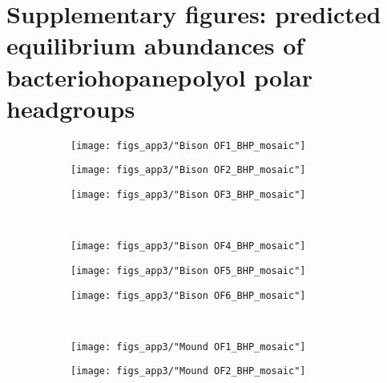 \chapter{Supplementary figures: predicted equilibrium abundances of bacteriohopanepolyol polar headgroups}

\singlespace

\begin{figure}[h]
\centering
    \begin{subfigure}[b]{\linewidth}
        \texttt{[image: figs\_app3/"Bison OF1\_BHP\_mosaic"]}
        \label{fig:BP1_degform}
    \end{subfigure}
    \begin{subfigure}[b]{\linewidth}
        \texttt{[image: figs\_app3/"Bison OF2\_BHP\_mosaic"]}
        \label{fig:BP2_degform}
    \end{subfigure}
\end{figure}

\newpage

\begin{figure}[h]\ContinuedFloat
    \begin{subfigure}[b]{\linewidth}
        \texttt{[image: figs\_app3/"Bison OF3\_BHP\_mosaic"]}
        \label{fig:BP3_degform}
    \end{subfigure}\\[-4ex]
    \begin{subfigure}[b]{\linewidth}
    	\texttt{[image: figs\_app3/"Bison OF4\_BHP\_mosaic"]}
        \label{fig:BP4_degform}
    \end{subfigure}
\end{figure}

\newpage

\begin{figure}[h]\ContinuedFloat
    \begin{subfigure}[b]{\linewidth}
        \texttt{[image: figs\_app3/"Bison OF5\_BHP\_mosaic"]}
        \label{fig:BP5_degform}
    \end{subfigure}
    \begin{subfigure}[b]{\linewidth}
        \texttt{[image: figs\_app3/"Bison OF6\_BHP\_mosaic"]}
        \label{fig:BP6_degform}
    \end{subfigure}\\[-4ex]
\end{figure}

\newpage

\begin{figure}[h]\ContinuedFloat
    \begin{subfigure}[b]{\linewidth}
    	\texttt{[image: figs\_app3/"Mound OF1\_BHP\_mosaic"]}
        \label{fig:MS1_degform}
    \end{subfigure}
    \begin{subfigure}[b]{\linewidth}
        \texttt{[image: figs\_app3/"Mound OF2\_BHP\_mosaic"]}
        \label{fig:MS2_degform}
    \end{subfigure}
\end{figure}

